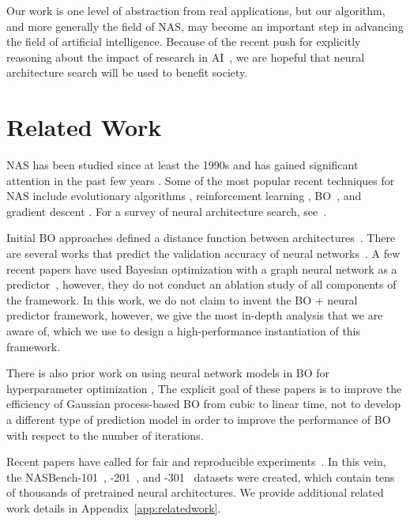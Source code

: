 \documentclass[11pt]{article}
\numberwithin{equation}{section}
\numberwithin{figure}{section}
\theoremstyle{plain}
\theoremstyle{definition}
\begin{document}
Our work is one level of abstraction from real applications,
but our algorithm, and more generally the field of NAS,
may become an important step in advancing the field of artificial intelligence.
Because of the recent push for explicitly reasoning about the impact of
research in AI~\cite{hecht2018time}, we are hopeful that neural architecture
search will be used to benefit society.
 
\section{Related Work}
\label{sec:relatedwork}

NAS has been studied since at least the 1990s
and has gained significant attention in the past few years
\cite{kitano1990designing, stanley2002evolving, zoph2017neural}. 
Some of the most popular recent techniques for NAS include evolutionary algorithms \cite{maziarz2018evolutionary}, reinforcement learning \cite{zoph2017neural, enas}, BO~\cite{nasbot}, and gradient descent \cite{darts}.
For a survey of neural architecture search, see~\cite{nas-survey}.

Initial BO approaches defined a distance function between 
architectures~\cite{nasbot, auto-keras}.
There are several works that predict the validation accuracy 
of neural 
networks~\cite{klein2016learning, peephole, tapas, zhang2018graph, baker2017accelerating}.
A few recent papers have used Bayesian optimization with a graph neural
network as a predictor~\cite{ma2019deep, shi2019multi},
however, they do not conduct an ablation study of all components of the 
framework.
In this work, we do not claim to invent the BO + neural predictor framework,
however, we give the most in-depth analysis that we are aware of, which we
use to design a high-performance instantiation of this framework.

There is also prior work on using neural network models in
BO for hyperparameter optimization
\cite{snoek2015scalable, springenberg2016bayesian}, 
The explicit goal of these papers is to improve the efficiency of 
Gaussian process-based BO from cubic to linear time,
not to develop a different type of prediction model in order to
improve the performance of BO with respect to the number of iterations. 

Recent papers have called for fair and reproducible experiments~\cite{randomnas,  nasbench}.
In this vein, the NASBench-101~\cite{nasbench}, -201~\cite{nasbench201},
and -301~\cite{nasbench301} datasets 
were created, which contain tens of thousands of pretrained neural architectures.
We provide additional related work details in Appendix~\ref{app:relatedwork}.
\end{document}
